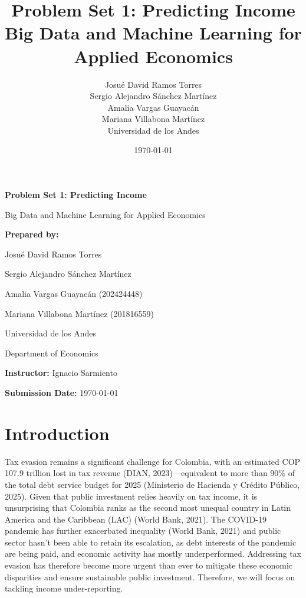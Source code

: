 \documentclass[a4paper,12pt]{article}
\title{\textbf{Problem Set 1: Predicting Income} \bigskip \\ Big Data and Machine Learning for Applied Economics}
\author{Josu\'e David Ramos Torres \\ Sergio Alejandro S\'anchez Mart\'inez \\ Amalia Vargas Guayac\'an \\ Mariana Villabona Mart\'inez \\ Universidad de los Andes}
\date{\today}
\begin{document}
\begin{titlepage}
    \centering
    \vspace{3cm}
    {\Huge \textbf{Problem Set 1: Predicting Income} \par}
    \vspace{1cm}
    {\LARGE Big Data and Machine Learning for Applied Economics \par}
    \vspace{3cm}
    {\Large \textbf{Prepared by:} \par}
    \vspace{0.5cm}
    {\Large Josu\'e David Ramos Torres  \par}
    {\Large Sergio Alejandro S\'anchez Mart\'inez \par}
    {\Large Amalia Vargas Guayac\'an (202424448)\par}
    {\Large Mariana Villabona Mart\'inez (201816559)\par}
    \vspace{2cm}
    {\large Universidad de los Andes \par}
    {\large Department of Economics \par}
    \vspace{1cm}
    {\large \textbf{Instructor:} Ignacio Sarmiento\par}
    \vspace{1cm}
    {\large \textbf{Submission Date:} \today \par}
    \vfill
\end{titlepage}

\newpage
\doublespacing

\section{Introduction}

Tax evasion remains a significant challenge for Colombia, with an estimated COP 107.9 trillion lost in tax revenue (DIAN, 2023)—equivalent to more than 90$\%$ of the total debt service budget for 2025 (Ministerio de Hacienda y Crédito Público, 2025). Given that public investment relies heavily on tax income, it is unsurprising that Colombia ranks as the second most unequal country in Latin America and the Caribbean (LAC) (World Bank, 2021). The COVID-19 pandemic has further exacerbated inequality (World Bank, 2021) and public sector hasn’t been able to retain its escalation, as debt interests of the pandemic are being paid, and economic activity has mostly underperformed. Addressing tax evasion has therefore become more urgent than ever to mitigate these economic disparities and ensure sustainable public investment. Therefore, we will focus on tackling  income under-reporting. 
\end{document}
